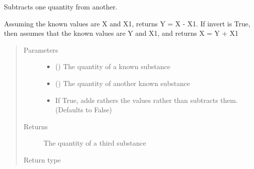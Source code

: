 \documentclass[a4paper,10pt,english]{sphinxmanual}
\begin{document}
\begin{fulllineitems}
\label{\detokenize{calculators:calculators.Subtraction}}
Subtracts one quantity from another.

Assuming the known values are X and X1, returns Y = X - X1.
If invert is True, then assumes that the known values are Y and X1, and
returns X = Y + X1
\begin{quote}\begin{description}
\item[{Parameters}] \leavevmode\begin{itemize}
\item {} 
 () \textendash{} The quantity of a known substance

\item {} 
 () \textendash{} The quantity of another known substance

\item {} 
 \textendash{} If True, adds rathers the values rather than subtracts them.
(Defaults to False)

\end{itemize}

\item[{Returns}] \leavevmode
The quantity of a third substance

\item[{Return type}] \leavevmode
{}

\end{description}\end{quote}

\end{fulllineitems}

\end{document}

